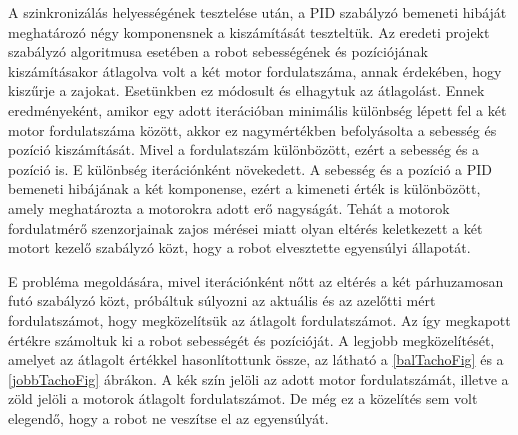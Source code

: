 A szinkronizálás helyességének tesztelése után, a PID szabályzó bemeneti hibáját meghatározó négy komponensnek a kiszámítását teszteltük. Az eredeti projekt szabályzó algoritmusa esetében a robot sebességének és pozíciójának kiszámításakor átlagolva volt a két motor fordulatszáma, annak érdekében, hogy kiszűrje a zajokat. Esetünkben ez módosult és elhagytuk az átlagolást. Ennek eredményeként, amikor egy adott iterációban minimális különbség lépett fel a két motor fordulatszáma között, akkor ez nagymértékben befolyásolta a sebesség és pozíció kiszámítását. Mivel a fordulatszám különbözött, ezért a sebesség és a pozíció is. E különbség iterációnként növekedett. A sebesség és a pozíció a PID bemeneti hibájának a két komponense, ezért a kimeneti érték is különbözött, amely meghatározta a motorokra adott erő nagyságát. Tehát a motorok fordulatmérő szenzorjainak zajos mérései miatt olyan eltérés keletkezett a két motort kezelő szabályzó közt, hogy a robot elvesztette egyensúlyi állapotát.

E probléma megoldására, mivel iterációnként nőtt az eltérés a két párhuzamosan futó szabályzó közt, próbáltuk súlyozni az aktuális és az azelőtti mért fordulatszámot, hogy megközelítsük az átlagolt fordulatszámot. Az így megkapott értékre számoltuk ki a robot sebességét és pozícióját. A legjobb megközelítését, amelyet az átlagolt értékkel hasonlítottunk össze, az látható a \ref{balTachoFig} és a \ref{jobbTachoFig} ábrákon. A kék szín jelöli az adott motor fordulatszámát, illetve a zöld jelöli a motorok átlagolt fordulatszámot. De még ez a közelítés sem volt elegendő, hogy a robot ne veszítse el az egyensúlyát.

